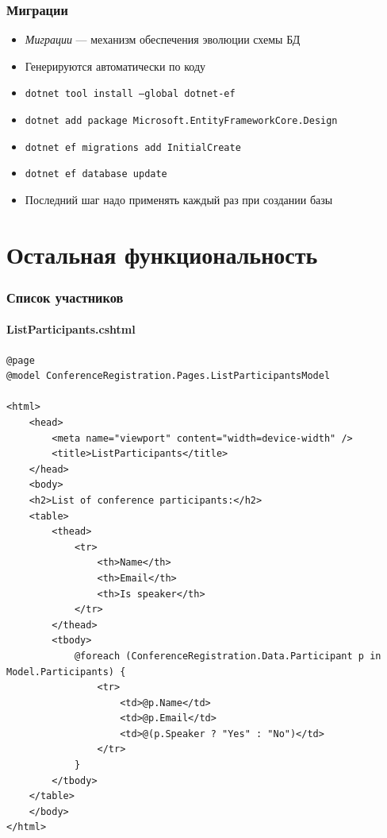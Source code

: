 \documentclass{../../slides-style}
\begin{document}
    \begin{frame}[fragile]
        \frametitle{Миграции}
        \begin{itemize}
            \item \emph{Миграции} --- механизм обеспечения эволюции схемы БД
            \item Генерируются автоматически по коду
            \item \texttt{dotnet tool install --global dotnet-ef}
            \item \texttt{dotnet add package Microsoft.EntityFrameworkCore.Design}
            \item \texttt{dotnet ef migrations add InitialCreate}
            \item \texttt{dotnet ef database update}
            \item Последний шаг надо применять каждый раз при создании базы
        \end{itemize}
    \end{frame}

    \section{Остальная функциональность}

    \begin{frame}[fragile]
        \frametitle{Список участников}
        \framesubtitle{ListParticipants.cshtml}
        \begin{ssmall}
            \begin{verbatim}
@page
@model ConferenceRegistration.Pages.ListParticipantsModel

<html>
    <head>
        <meta name="viewport" content="width=device-width" />
        <title>ListParticipants</title>
    </head>
    <body>
    <h2>List of conference participants:</h2>
    <table>
        <thead>
            <tr>
                <th>Name</th>
                <th>Email</th>
                <th>Is speaker</th>
            </tr>
        </thead>
        <tbody>
            @foreach (ConferenceRegistration.Data.Participant p in Model.Participants) {
                <tr>
                    <td>@p.Name</td>
                    <td>@p.Email</td>
                    <td>@(p.Speaker ? "Yes" : "No")</td>
                </tr>
            }
        </tbody>
    </table>
    </body>
</html>
            \end{verbatim}
        \end{ssmall}
    \end{frame}
\end{document}
